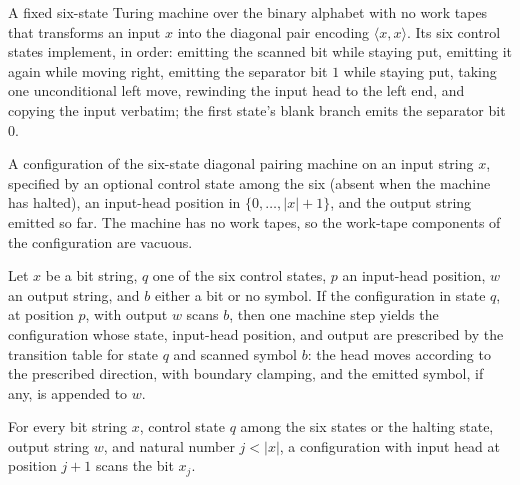 \begin{definition}
\label{Turing.pairDiagTM}
\leanok
{}
A fixed six-state Turing machine over the binary alphabet with no work tapes
that transforms an input $x$ into the diagonal pair encoding
$\langle x, x\rangle$.  Its six control states implement, in order: emitting
the scanned bit while staying put, emitting it again while moving right,
emitting the separator bit $1$ while staying put, taking one unconditional
left move, rewinding the input head to the left end, and copying the input
verbatim; the first state's blank branch emits the separator bit $0$.
\end{definition}

\begin{definition}
\label{Turing.pairDiagCfg}
\leanok
{}
A configuration of the six-state diagonal pairing machine on an input string
$x$, specified by an optional control state among the six (absent when the
machine has halted), an input-head position in $\{0, \dots, |x| + 1\}$, and
the output string emitted so far.  The machine has no work tapes, so the
work-tape components of the configuration are vacuous.
\end{definition}

\begin{lemma}
\label{Turing.pairDiag_step}
\leanok
{}
Let $x$ be a bit string, $q$ one of the six control states, $p$ an input-head position,
$w$ an output string, and $b$ either a bit or no symbol. If the configuration in state
$q$, at position $p$, with output $w$ scans $b$, then one machine step yields the
configuration whose state, input-head position, and output are prescribed by the
transition table for state $q$ and scanned symbol $b$: the head moves according to the
prescribed direction, with boundary clamping, and the emitted symbol, if any, is
appended to $w$.
\end{lemma}

\begin{lemma}
\label{Turing.pairDiag_inner}
\leanok
{}
For every bit string $x$, control state $q$ among the six states or the halting state,
output string $w$, and natural number $j<|x|$, a configuration with input head at
position $j+1$ scans the bit $x_j$.
\end{lemma}

